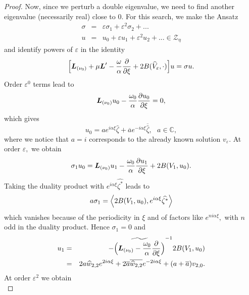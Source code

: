 \documentclass[11pt]{article}
\begin{document}
\begin{proof}
Now, since we perturb a double eigenvalue, we need to find another
eigenvalue (necessarily real) close to $0.$ For this search, we make the Ansatz%
\begin{eqnarray*}
\sigma &=&\varepsilon \sigma _{1}+\varepsilon ^{2}\sigma _{2}+... \\
u &=&u_{0}+\varepsilon u_{1}+\varepsilon ^{2}u_{2}+...\in \mathcal{Z}_{\eta}
\end{eqnarray*}%
and identify powers of $\varepsilon $ in the identity%
\begin{equation*}
\Bigl[ \boldsymbol{L}_{(\nu_0)}+\mu \boldsymbol{L}^{\prime }-\frac{\omega }{\alpha }%
\frac{\partial }{\partial \xi }+2B(\widehat{V}_{\varepsilon },\cdot
)\Bigr]u=\sigma u.
\end{equation*}%
Order $\varepsilon ^{0}$ terms lead to%
\begin{equation*}
\boldsymbol{L}_{(\nu_0)}u_{0}-\frac{\omega _{0}}{\alpha }\frac{\partial u_{0}}{%
\partial \xi }=0,
\end{equation*}%
which gives%
\begin{equation*}
u_{0}=ae^{i\alpha \xi }\widehat{\zeta }+\overline{a}e^{-i\alpha \xi }%
\overline{\widehat{\zeta }},\text{ }a\in \mathbb{C},
\end{equation*}%
where we notice that $a=i$ corresponds to the already known solution $%
v_{\varepsilon }.$ At order $\varepsilon ,$ we obtain%
\begin{equation*}
\sigma _{1}u_{0}=\boldsymbol{L}_{(\nu_0)}u_{1}-\frac{\omega _{0}}{\alpha }\frac{%
\partial u_{1}}{\partial \xi }+2B(V_{1},u_{0}).
\end{equation*}%
Taking the duality product with $e^{i\alpha \xi }\widehat{\zeta ^{\ast }}$
leads to%
\begin{equation*}
a\sigma _{1}= \Bigl\langle 2B(V_{1},u_{0}),e^{i\alpha \xi }\widehat{\zeta ^{\ast }}%
\Bigr\rangle
\end{equation*}%
which vanishes because of the periodicity in $\xi $ and of factors like $%
e^{ni\alpha \xi },$ with $n$ odd in the duality product. Hence $\sigma
_{1}=0 $ and%
\begin{eqnarray*}
u_{1} &=&-\widetilde{ \Bigl( \boldsymbol{L}_{(\nu_0)}-\frac{\omega _{0}}{\alpha }\frac{%
\partial }{\partial \xi } \Bigr)}^{-1}2B(V_{1},u_{0}) \\
&=&2a\widehat{w}_{2,2}e^{2i\alpha \xi }+2\overline{a}\overline{\widehat{w}%
_{2,2}}e^{-2i\alpha \xi }+(a+\overline{a})v_{2,0}.
\end{eqnarray*}%
At order $\varepsilon ^{2}$ we obtain%
\begin{equation*}

\end{equation*}
\end{proof}
\end{document}

